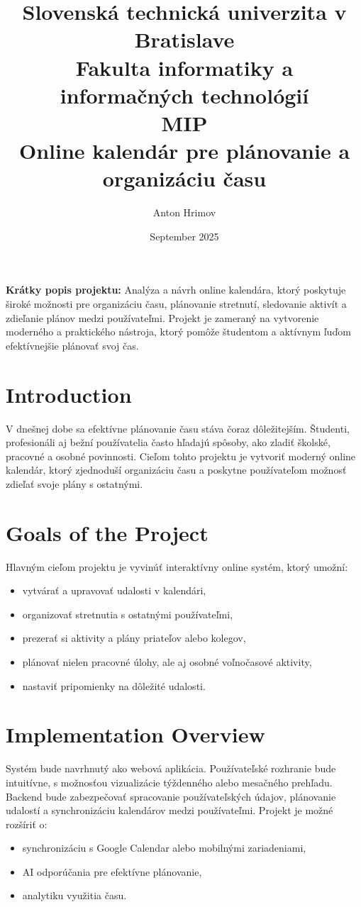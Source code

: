 \documentclass[a4paper,12pt]{article}
\title{
    Slovenská technická univerzita v Bratislave\\
    Fakulta informatiky a informačných technológií\\[1em]
    \large MIP\\[2em]
    \textbf{Online kalendár pre plánovanie a organizáciu času}
}
\author{Anton Hrimov}
\date{September 2025}
\begin{document}
\maketitle
\thispagestyle{empty}

\vspace{1cm}
\textbf{Krátky popis projektu:} 
Analýza a návrh online kalendára, ktorý poskytuje široké možnosti pre organizáciu času, plánovanie stretnutí, sledovanie aktivít a zdieľanie plánov medzi používateľmi. Projekt je zameraný na vytvorenie moderného a praktického nástroja, ktorý pomôže študentom a aktívnym ľuďom efektívnejšie plánovať svoj čas.

\newpage

\section{Introduction}
V dnešnej dobe sa efektívne plánovanie času stáva čoraz dôležitejším. Študenti, profesionáli aj bežní používatelia často hľadajú spôsoby, ako zladiť školské, pracovné a osobné povinnosti. Cieľom tohto projektu je vytvoriť moderný online kalendár, ktorý zjednoduší organizáciu času a poskytne používateľom možnosť zdieľať svoje plány s ostatnými.

\section{Goals of the Project}
Hlavným cieľom projektu je vyvinúť interaktívny online systém, ktorý umožní:
\begin{itemize}
    \item vytvárať a upravovať udalosti v kalendári,
    \item organizovať stretnutia s ostatnými používateľmi,
    \item prezerať si aktivity a plány priateľov alebo kolegov,
    \item plánovať nielen pracovné úlohy, ale aj osobné voľnočasové aktivity,
    \item nastaviť pripomienky na dôležité udalosti.
\end{itemize}

\section{Implementation Overview}
Systém bude navrhnutý ako webová aplikácia. Používateľské rozhranie bude intuitívne, s možnosťou vizualizácie týždenného alebo mesačného prehľadu.  
Backend bude zabezpečovať spracovanie používateľských údajov, plánovanie udalostí a synchronizáciu kalendárov medzi používateľmi.  
Projekt je možné rozšíriť o:
\begin{itemize}
    \item synchronizáciu s Google Calendar alebo mobilnými zariadeniami,
    \item AI odporúčania pre efektívne plánovanie,
    \item analytiku využitia času.
\end{itemize}
\end{document}
